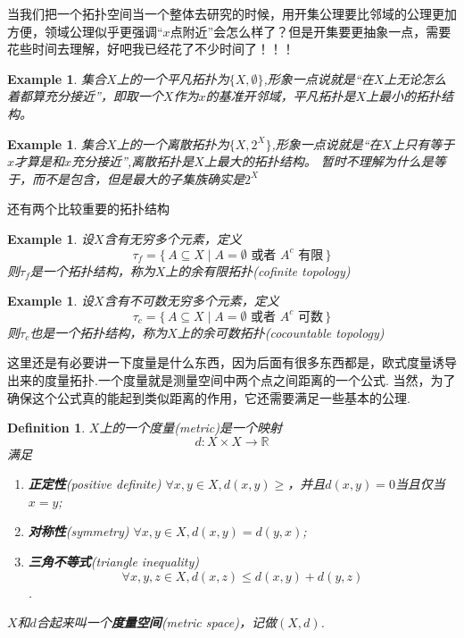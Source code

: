 \documentclass{article}
\newtheorem{example}[theorem]{Example}
\newtheorem{definition}[theorem]{Definition}
\newcommand*{\xfunc}[4]{{#2}\colon{#3}{#1}{#4}}
\newcommand*{\func}[3]{\xfunc{\to}{#1}{#2}{#3}}
\newcommand\Set[2]{\{\,#1\mid#2\,\}} %
\begin{document}
当我们把一个拓扑空间当一个整体去研究的时候，用开集公理要比邻域的公理更加方便，领域公理似乎更强调“$x$点附近”会怎么样了？但是开集要更抽象一点，需要花些时间去理解，好吧我已经花了不少时间了！！！

\begin{example}
集合$X$上的一个平凡拓扑为$\{X,\emptyset\}$,形象一点说就是“在$X$上无论怎么着都算充分接近”，即取一个$X$作为$x$的基准开邻域，平凡拓扑是$X$上最小的拓扑结构。
\end{example}

\begin{example}
集合$X$上的一个离散拓扑为$\{X,2^{X}\}$,形象一点说就是“在$X$上只有等于$x$才算是和$x$充分接近”,离散拓扑是$X$上最大的拓扑结构。 暂时不理解为什么是等于，而不是包含，但是最大的子集族确实是$2^{X}$
\end{example}

还有两个比较重要的拓扑结构

\begin{example}
设$X$含有无穷多个元素，定义\[\tau_f = \Set{A \subseteq X}{A = \emptyset \text{ 或者 } A^c \text{ 有限}}\]则$\tau_f$是一个拓扑结构，称为$X$上的余有限拓扑(cofinite topology)
\end{example}

\begin{example}
设$X$含有不可数无穷多个元素，定义\[\tau_c = \Set{A \subseteq X}{A = \emptyset \text{ 或者 } A^c \text{ 可数}}\]则$\tau_c$也是一个拓扑结构，称为$X$上的余可数拓扑(cocountable topology)
\end{example}

这里还是有必要讲一下度量是什么东西，因为后面有很多东西都是，欧式度量诱导出来的度量拓扑.一个度量就是测量空间中两个点之间距离的一个公式. 当然，为了确保这个公式真的能起到类似距离的作用，它还需要满足一些基本的公理.

\begin{definition}
$X$上的一个度量(metric)是一个映射\[\func{d}{X \times X}{\mathbb{R}}\]满足
\begin{enumerate}
	\item \textbf{正定性}(positive definite) $\forall x,y \in X,d(x,y) \geq$，并且$d(x,y)=0$当且仅当$x=y$;
	\item \textbf{对称性}(symmetry) $\forall x,y \in X,d(x,y)=d(y,x)$;
	\item \textbf{三角不等式}(triangle inequality) \[\forall x,y,z \in X,d(x,z) \leq d(x,y)+d(y,z)\].
\end{enumerate}
$X$和$d$合起来叫一个\textbf{度量空间}(metric space)，记做$(X,d)$.
\end{definition}
\end{document}
